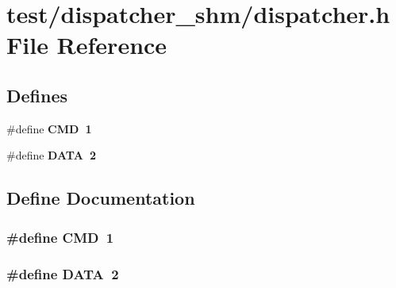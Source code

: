 \section{test/dispatcher\_\-shm/dispatcher.h File Reference}
\label{shm_2dispatcher_8h}
\subsection*{Defines}
\begin{CompactItemize}
\item 
\#define \bf{CMD}~1
\item 
\#define \bf{DATA}~2
\end{CompactItemize}


\subsection{Define Documentation}
\subsubsection{\setlength{\rightskip}{0pt plus 5cm}\#define CMD~1}\label{shm_2dispatcher_8h_0a5ceb9ceb914e08d345410b561cb37a}


\subsubsection{\setlength{\rightskip}{0pt plus 5cm}\#define DATA~2}\label{shm_2dispatcher_8h_ad9ae913bdfab20dd94ad04ee2d5b045}



